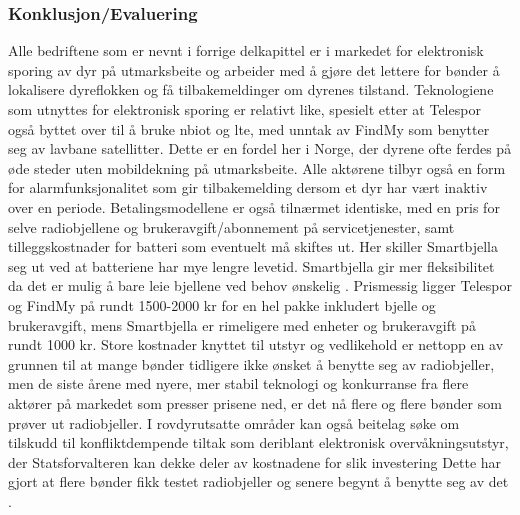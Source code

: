 \subsubsection{Konklusjon/Evaluering}
Alle bedriftene som er nevnt i forrige delkapittel er i markedet for elektronisk sporing av dyr på utmarksbeite og arbeider med å gjøre det lettere for bønder å lokalisere dyreflokken og få tilbakemeldinger om dyrenes tilstand. Teknologiene som utnyttes for elektronisk sporing er relativt like, spesielt etter at Telespor også byttet over til å bruke \acrshort{nbiot} og \acrshort{lte}, med unntak av FindMy som benytter seg av lavbane satellitter. Dette er en fordel her i Norge, der dyrene ofte ferdes på øde steder uten mobildekning på utmarksbeite. Alle aktørene tilbyr også en form for alarmfunksjonalitet som gir tilbakemelding dersom et dyr har vært inaktiv over en periode. Betalingsmodellene er også tilnærmet identiske, med en pris for selve radiobjellene og brukeravgift/abonnement på servicetjenester, samt tilleggskostnader for batteri som eventuelt må skiftes ut. Her skiller Smartbjella seg ut ved at batteriene har mye lengre levetid. Smartbjella gir mer fleksibilitet da det er mulig å bare leie bjellene ved behov ønskelig \cite{SMARTBELLSEmisjonskampanjeFolkeinvest2019}. Prismessig ligger Telespor og FindMy på rundt 1500-2000 kr for en hel pakke inkludert bjelle og brukeravgift, mens Smartbjella er rimeligere med enheter og brukeravgift på rundt 1000 kr. 
\newline 
\newline
Store kostnader knyttet til utstyr og vedlikehold er nettopp en av grunnen til at mange bønder tidligere ikke ønsket å benytte seg av radiobjeller, men de siste årene med nyere, mer stabil teknologi og konkurranse fra flere aktører på markedet som presser prisene ned, er det nå flere og flere bønder som prøver ut  radiobjeller. I rovdyrutsatte områder kan også beitelag søke om tilskudd til konfliktdempende tiltak som deriblant elektronisk overvåkningsutstyr, der Statsforvalteren kan dekke deler av kostnadene for slik investering Dette har gjort at flere bønder fikk testet radiobjeller og senere begynt å benytte seg av det \cite[~s.61, 66]{kvamRoleAdvisoryServices2019} \cite{landbruksdirektoratetTilskuddTilTiltak}.  
\newline
\newline

